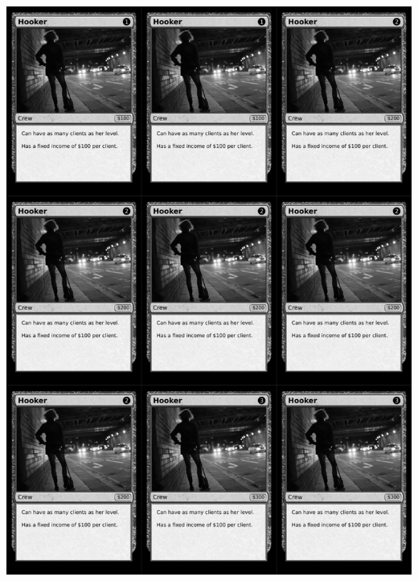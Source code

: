 \documentclass[a4paper]{article}
\begin{document}
\newpage

\begin{center}
	\centering
	\includegraphics[width=200.5mm,height=280.7mm]{output/temp/page13.png}
\end{center}
\end{document}
